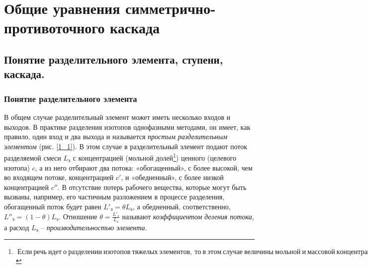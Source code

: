 \chapter{Общие уравнения симметрично-противоточного каскада}


\section{Понятие разделительного элемента, ступени, каскада.}


\subsection{Понятие разделительного элемента}

В общем случае разделительный элемент может иметь несколько входов и выходов. В практике разделения изотопов однофазными методами, он имеет, как правило, один вход и два выхода и называется \textit{простым разделительным элементом} (рис. \ref{1_1}). В этом случае в разделительный элемент подают поток разделяемой смеси $L_{э} $ с концентрацией (мольной долей\footnote{ $\ \textrm{Е}\textrm{с}\textrm{л}\textrm{и}\ \textrm{р}\textrm{е}\textrm{ч}\textrm{ь}\ \textrm{и}\textrm{д}\textrm{е}\textrm{т}\ \textrm{о}\ \textrm{р}\textrm{а}\textrm{з}\textrm{д}\textrm{е}\textrm{л}\textrm{е}\textrm{н}\textrm{и}\textrm{и}\ \textrm{и}\textrm{з}\textrm{о}\textrm{т}\textrm{о}\textrm{п}\textrm{о}\textrm{в}\ \textrm{т}\textrm{я}\textrm{ж}\textrm{е}\textrm{л}\textrm{ы}\textrm{х}\ \textrm{э}\textrm{л}\textrm{е}\textrm{м}\textrm{е}\textrm{н}\textrm{т}\textrm{о}\textrm{в},\ \textrm{т}\textrm{о}\ \textrm{в}\ \textrm{э}\textrm{т}\textrm{о}\textrm{м}\ \textrm{с}\textrm{л}\textrm{у}\textrm{ч}\textrm{а}\textrm{е}\ \textrm{в}\textrm{е}\textrm{л}\textrm{и}\textrm{ч}\textrm{и}\textrm{н}\textrm{ы}\ \textrm{м}\textrm{о}\textrm{л}\textrm{ь}\textrm{н}\textrm{о}\textrm{й}\ \textrm{и}\ \textrm{м}\textrm{а}\textrm{с}\textrm{с}\textrm{о}\textrm{в}\textrm{о}\textrm{й}\ \textrm{к}\textrm{о}\textrm{н}\textrm{ц}\textrm{е}\textrm{н}\textrm{т}\textrm{р}\textrm{а}\textrm{ц}\textrm{и}\textrm{и}\ \textrm{п}\textrm{р}\textrm{а}\textrm{к}\textrm{т}\textrm{и}\textrm{ч}\textrm{е}\textrm{с}\textrm{к}\textrm{и}\ \textrm{с}\textrm{о}\textrm{в}\textrm{п}\textrm{а}\textrm{д}\textrm{а}\textrm{ю}\textrm{т}.$ }) ценного (целевого изотопа) $c$, а из него отбирают два потока: «обогащенный», с более высокой, чем во входящем потоке, концентрацией $c'$, и «обедненный», с более низкой концентрацией $c''$. В отсутствие потерь рабочего вещества, которые могут быть вызваны, например, его частичным разложением в процессе разделения, обогащенный поток будет равен $L'_{э} =\theta L_{э} $, а обедненный, соответственно,~~$L''_{э} =(1-\theta )L_{э} $. Отношение $\theta =\frac{L'_{э} }{L_{э} } $ называют \textit{коэффициентом деления потока}, а расход $L_{э} $ -- \textit{производительностью элемента}. 



